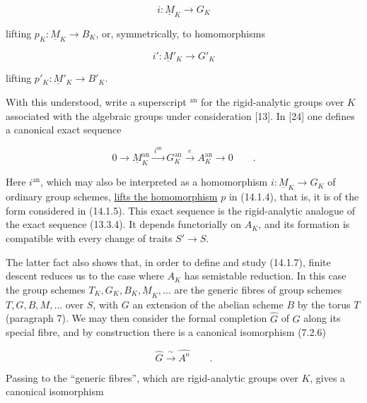 \begin{equation}\tag{14.1.5}
 i:\underline M_K\longrightarrow G_K
\end{equation}

\noindent
lifting $p_K:\underline M_K\longrightarrow B_K$, or, symmetrically, to
homomorphisms

\begin{equation}\tag{14.1.6}
 i':\underline M'_K\longrightarrow G'_K
\end{equation}

\noindent
lifting $p'_K:\underline M'_K\longrightarrow B'_K$.

With this understood, write a superscript ${}^{\mathrm{an}}$ for the
rigid-analytic groups over $K$ associated with the algebraic groups
under consideration [13].  In [24] one defines a canonical exact
sequence

\begin{equation}\tag{14.1.7}
 0\longrightarrow\underline M_K^{\mathrm{an}}
 \xrightarrow{\ i^{\mathrm{an}}\ }G_K^{\mathrm{an}}
 \xrightarrow{\ e\ }A_K^{\mathrm{an}}\longrightarrow0\qquad .
\end{equation}

\noindent
Here $i^{\mathrm{an}}$, which may also be interpreted as a homomorphism
$i:\underline M_K\longrightarrow G_K$ of ordinary group schemes,
\underline{lifts the homomorphism} $p$ in (14.1.4), that is, it is of
the form considered in (14.1.5).  This exact sequence is the
rigid-analytic analogue of the exact sequence (13.3.4).  It depends
functorially on $A_K$, and its formation is compatible with every
change of traits $S'\longrightarrow S$.

The latter fact also shows that, in order to define and study (14.1.7),
finite descent reduces us to the case where $A_K$ has semistable
reduction.  In this case the group schemes
$T_K,G_K,B_K,\underline M_K,\ldots$ are the generic fibres of group
schemes $T,G,B,M,\ldots$ over $S$, with $G$ an extension of the abelian
scheme $B$ by the torus $T$ (paragraph 7).  We may then consider the
formal completion $\hat G$ of $G$ along its special fibre, and by
construction there is a canonical isomorphism (7.2.6)

\begin{equation}\tag{14.1.8}
 \hat G\xrightarrow{\ \sim\ }\widehat{A^{\mathrm o}}
 \qquad .
\end{equation}

\noindent
Passing to the ``generic fibres'', which are rigid-analytic groups over
$K$, gives a canonical isomorphism

